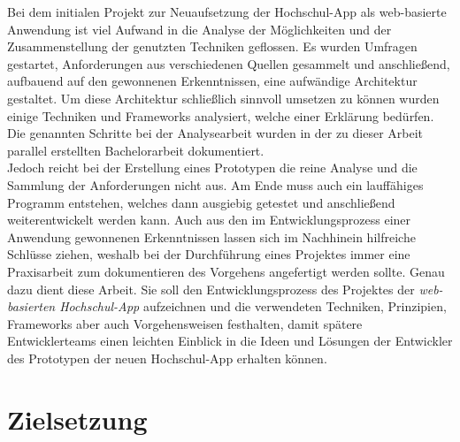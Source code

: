 Bei dem initialen Projekt zur Neuaufsetzung der Hochschul-\ac{App} als web-basierte Anwendung ist viel Aufwand in die Analyse der Möglichkeiten und der Zusammenstellung der genutzten Techniken geflossen. Es wurden Umfragen gestartet, Anforderungen aus verschiedenen Quellen gesammelt und anschließend, aufbauend auf den gewonnenen Erkenntnissen, eine aufwändige Architektur gestaltet. Um diese Architektur schließlich sinnvoll umsetzen zu können wurden einige Techniken und Frameworks analysiert, welche einer Erklärung bedürfen. Die genannten Schritte bei der Analysearbeit wurden in der zu dieser Arbeit parallel erstellten Bachelorarbeit dokumentiert\autocite[][]{dnba}.\\
\linebreak
Jedoch reicht bei der Erstellung eines Prototypen die reine Analyse und die Sammlung der Anforderungen nicht aus. Am Ende muss auch ein lauffähiges Programm entstehen, welches dann ausgiebig getestet und anschließend weiterentwickelt werden kann. Auch aus den im Entwicklungsprozess einer Anwendung gewonnenen Erkenntnissen lassen sich im Nachhinein hilfreiche Schlüsse ziehen, weshalb bei der Durchführung eines Projektes immer eine Praxisarbeit zum dokumentieren des Vorgehens angefertigt werden sollte. Genau dazu dient diese Arbeit. Sie soll den Entwicklungsprozess des Projektes der \textit{web-basierten Hochschul-\ac{App}} aufzeichnen und die verwendeten Techniken, Prinzipien, Frameworks aber auch Vorgehensweisen festhalten, damit spätere Entwicklerteams einen leichten Einblick in die Ideen und Lösungen der Entwickler des Prototypen der neuen Hochschul-\ac{App} erhalten können.

\section{Zielsetzung}


